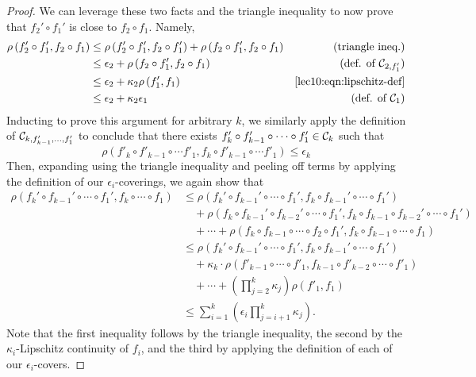 \begin{proof}
We can leverage these two facts and the triangle inequality to now prove that $f_2' \circ f_1'$ is close to $f_2 \circ f_1$. Namely,
\begin{align}
   \rho\left(f_2' \circ f_1', f_2 \circ f_1\right) &\leq \rho\left(f_2' \circ f_1', f_2 \circ f_1'\right) + \rho\left(f_2 \circ f_1', f_2 \circ f_1\right) &\text{(triangle ineq.)} \\ 
   &\leq \epsilon_2 + \rho\left(f_2 \circ f_1', f_2 \circ f_1\right) &\text{(def. of $\mathcal C_{2, f'_1}$)}\\ 
   &\leq \epsilon_2 + \kappa_2 \rho\left(f_1', f_1\right) &\text{\eqref{lec10:eqn:lipschitz-def}}\\ 
   &\leq \epsilon_2 + \kappa_2\epsilon_1 &\text{(def. of $\mathcal C_{1}$)}
\end{align}
Inducting to prove this argument for arbitrary $k$, we similarly apply the definition of $\mathcal C_{k, f'_{k - 1},\dots,f'_1}$ to conclude that there exists $f'_{k} \circ f'_{k - 1} \circ \cdots \circ f'_1 \in \mathcal C_k$ such that
\begin{equation}
    \rho(f'_k \circ f'_{k - 1} \circ \cdots f'_1, f_k \circ f'_{k - 1} \circ \cdots f'_1) \leq \epsilon_k
\end{equation}
Then, expanding using the triangle inequality and peeling off terms by applying the definition of our $\epsilon_i$-coverings, we again show that
\begin{align}
    \rho\left(f_k' \circ f_{k-1}' \circ \cdots \circ f_1', f_k \circ \cdots \circ f_1\right) &\leq \rho\left(f_k' \circ f_{k-1}'\circ \cdots \circ f_1', f_k \circ f_{k-1}'\circ \cdots \circ f_1' \right) \\ 
    &\quad + \rho\left(f_k \circ f_{k-1}'\circ f_{k-2}' \circ \cdots \circ f_1', f_k \circ f_{k-1}\circ f_{k-2}' \circ \cdots \circ f_1'\right) \nonumber \\ 
    &\quad + \cdots + \rho\left(f_k \circ f_{k-1}\circ \cdots \circ f_2 \circ f_1', f_k \circ f_{k-1}\circ \cdots \circ f_1\right) \nonumber \\ 
    &\leq \rho\left(f_k' \circ f_{k-1}'\circ \cdots \circ f_1', f_k \circ f_{k-1}'\circ \cdots \circ f_1' \right) \\
    &\quad + \kappa_{k} \cdot \rho(f'_{k - 1} \circ \cdots \circ f'_1, f_{k - 1} \circ f'_{k - 2} \circ \cdots \circ f'_1) \\
    &\quad + \cdots + \left(\prod_{j = 2}^k \kappa_j\right) \rho(f'_1, f_1) \nonumber  \\
    & \leq \sum_{i=1}^{k} \left(\epsilon_i\prod_{j=i+1}^{k}\kappa_{j}\right).
\end{align}
Note that the first inequality follows by the triangle inequality, the second by the $\kappa_i$-Lipschitz continuity of $f_i$, and the third by applying the definition of each of our $\epsilon_i$-covers.
\end{proof}

